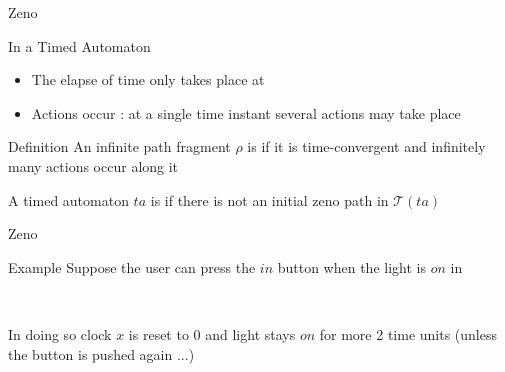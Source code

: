 \documentclass[aspectratio=169]{beamer}
\def\TL#1{\mathcal{T}(#1)}
\begin{document}
\begin{slide}{Zeno}
\small

\begin{block}{In a Timed Automaton}
\begin{itemize}
\item The elapse of time only takes place at 
\item Actions occur : at a single time instant several actions may take place
\end{itemize}

\end{block}

\pause
\begin{block}{Definition}
An infinite path fragment $\rho$ is  if it is \alert{time-convergent} and
\alert{infinitely many actions occur along it}



A timed automaton $ta$ is  if there is not an initial zeno path in $\TL{ta}$
\end{block}

\end{slide}


\begin{slide}{Zeno}
\small


\begin{block}{Example}
Suppose the user can press the $in$ button when the light is $on$ in
\begin{figure}[htb]
  \centering
  \\
\end{figure}
In doing so clock $x$ is reset to 0 and light stays $on$ for more 2 time units (unless the button is pushed again ...)
\end{block}

\end{slide}
\end{document}
